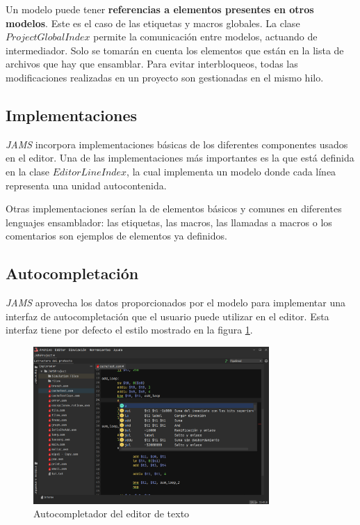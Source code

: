 Un modelo puede tener \textbf{referencias a elementos
presentes en otros modelos}.
Este es el caso de las etiquetas y macros globales.
La clase $ProjectGlobalIndex$ permite la
comunicación entre modelos, actuando de intermediador.
Solo se tomarán en cuenta los elementos que están
en la lista de archivos que hay que ensamblar.
Para evitar interbloqueos, todas las modificaciones
realizadas en un proyecto son gestionadas en el
mismo hilo.

\subsection{Implementaciones}\label{subsec:implementaciones}

\textit{JAMS} incorpora implementaciones básicas de los
diferentes componentes usados en el editor.
Una de las implementaciones más importantes es la que está
definida en la clase $EditorLineIndex$, la cual
implementa un modelo donde cada línea representa una
unidad autocontenida.

Otras implementaciones serían la de elementos
básicos y comunes en diferentes lenguajes ensamblador:
las etiquetas, las macros, las llamadas a macros o
los comentarios son ejemplos de elementos ya definidos.

\subsection{Autocompletación}\label{subsec:autocompletacion}

\textit{JAMS} aprovecha los datos proporcionados por
el modelo para implementar una interfaz de autocompletación
que el usuario puede utilizar en el editor.
Esta interfaz tiene por defecto el estilo mostrado en la figura \ref{fig:jams-autocompletador}.

\begin{figure}[h]
    \centering
    \includegraphics[width=0.8\textwidth]{images/base/jams-autocompletion}
    \caption{Autocompletador del editor de texto}
    \label{fig:jams-autocompletador}
\end{figure}

